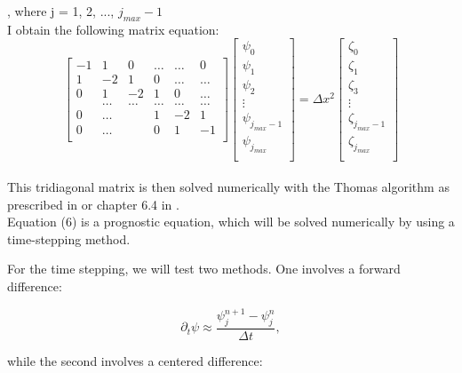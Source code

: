 , where j = 1, 2, ..., $j_{max}-1$\\

I obtain the following matrix equation:\\

\[
\begin{bmatrix}
       -1& 1& 0 &\dots   & \dots &0 \\
       1 & -2 & 1 &0 &\dots &\dots \\
       0&1 &-2 & 1 & 0 & \dots \\
       & \dots   & \dots &\dots   &\dots & \dots \\
       0&\dots   &  &1 &-2& 1 \\
       0&\dots    &  & 0  &1 & -1 \\
\end{bmatrix}
\begin{bmatrix}
	\psi_0 \\
	\psi_1 \\
	\psi_2 \\
	\vdots \\
	\psi_{j_{max}-1} \\
	\psi_{j_{max}} \\                      
\end{bmatrix} = 
\Delta x^2
\begin{bmatrix}
	\zeta_0 \\
	\zeta_1 \\
	\zeta_3 \\
	\vdots \\
	\zeta_{j_{max}-1} \\
	\zeta_{j_{max}} \\                      
\end{bmatrix}
\]\\

This tridiagonal matrix is then solved numerically with the Thomas algorithm as prescribed in \cite{trisolve} or chapter 6.4 in \cite{lecturenote}.\\

Equation (6) is a prognostic equation, which will be solved numerically by using a time-stepping method.


For the time stepping, we will test two methods. One involves a
forward difference:

\begin{equation}
  \label{eq:Rossby3}
  \partial_t\psi \approx \frac{\psi_{j}^{n+1} - \psi_{j}^{n}}{\Delta t} ,
\end{equation}

while the second involves a centered difference:

